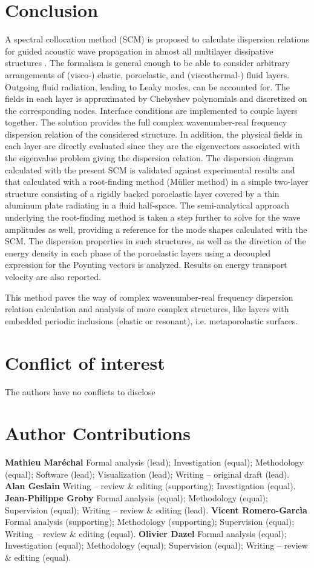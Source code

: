\section{Conclusion}
A spectral collocation method (SCM) is proposed to calculate dispersion relations for guided acoustic wave propagation in almost all multilayer dissipative structures . The formalism is general enough to be able to consider arbitrary arrangements of (visco-) elastic, poroelastic, and (viscothermal-) fluid layers. Outgoing fluid radiation, leading to Leaky modes, can be accounted for. The fields in each layer is approximated by Chebyshev polynomials and discretized on the corresponding nodes. Interface conditions are implemented to couple layers together. The solution provides the full complex wavenumber-real frequency dispersion relation of the considered structure. In addition, the physical fields in each layer are directly evaluated since they are the eigenvectors associated with the eigenvalue problem giving the dispersion relation. The dispersion diagram calculated with the present SCM is validated against experimental results and that calculated with a root-finding method (M\"uller method) in a simple two-layer structure consisting of a rigidly backed poroelastic layer covered by a thin aluminum plate radiating in a fluid half-space. The semi-analytical approach underlying the root-finding method is taken a step further to solve for the wave amplitudes as well, providing a reference for the mode shapes calculated with the SCM.  The dispersion properties in such structures, as well as the direction of the energy density in each phase of the poroelastic layers using a decoupled expression for the Poynting vectors is analyzed. Results on energy transport velocity are also reported. 

This method paves the way of complex wavenumber-real frequency dispersion relation calculation and analysis of more complex structures, like layers with embedded periodic inclusions (elastic or resonant), i.e. metaporolastic surfaces.      

\section*{Conflict of interest}
The authors have no conflicts to disclose
\section*{Author Contributions}
\textbf{Mathieu Maréchal}
Formal analysis (lead); 
Investigation (equal); 
Methodology (equal); 
Software (lead); 
Visualization (lead); 
Writing – original draft (lead).
\textbf{Alan Geslain}
Writing – review \& editing (supporting); Investigation (equal). 
\textbf{Jean-Philippe Groby}
Formal analysis (equal);
Methodology (equal);
Supervision (equal);
Writing – review \& editing (lead).
\textbf{Vicent Romero-Garcìa}
Formal analysis (supporting);
Methodology (supporting);
Supervision (equal);
Writing – review \& editing (equal).
\textbf{Olivier Dazel}
Formal analysis (equal);
Investigation (equal);
Methodology (equal);
Supervision (equal);
Writing – review \& editing (equal).

